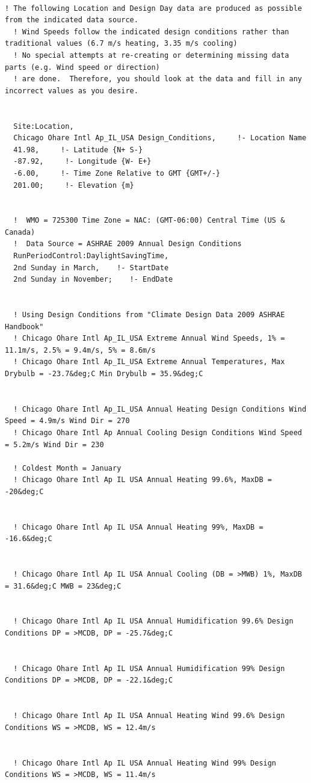 \begin{lstlisting}

! The following Location and Design Day data are produced as possible from the indicated data source.
  ! Wind Speeds follow the indicated design conditions rather than traditional values (6.7 m/s heating, 3.35 m/s cooling)
  ! No special attempts at re-creating or determining missing data parts (e.g. Wind speed or direction)
  ! are done.  Therefore, you should look at the data and fill in any incorrect values as you desire.


  Site:Location,
  Chicago Ohare Intl Ap_IL_USA Design_Conditions,     !- Location Name
  41.98,     !- Latitude {N+ S-}
  -87.92,     !- Longitude {W- E+}
  -6.00,     !- Time Zone Relative to GMT {GMT+/-}
  201.00;     !- Elevation {m}


  !  WMO = 725300 Time Zone = NAC: (GMT-06:00) Central Time (US & Canada)
  !  Data Source = ASHRAE 2009 Annual Design Conditions
  RunPeriodControl:DaylightSavingTime,
  2nd Sunday in March,    !- StartDate
  2nd Sunday in November;    !- EndDate


  ! Using Design Conditions from "Climate Design Data 2009 ASHRAE Handbook"
  ! Chicago Ohare Intl Ap_IL_USA Extreme Annual Wind Speeds, 1% = 11.1m/s, 2.5% = 9.4m/s, 5% = 8.6m/s
  ! Chicago Ohare Intl Ap_IL_USA Extreme Annual Temperatures, Max Drybulb = -23.7&deg;C Min Drybulb = 35.9&deg;C


  ! Chicago Ohare Intl Ap_IL_USA Annual Heating Design Conditions Wind Speed = 4.9m/s Wind Dir = 270
  ! Chicago Ohare Intl Ap Annual Cooling Design Conditions Wind Speed = 5.2m/s Wind Dir = 230

  ! Coldest Month = January
  ! Chicago Ohare Intl Ap IL USA Annual Heating 99.6%, MaxDB = -20&deg;C


  ! Chicago Ohare Intl Ap IL USA Annual Heating 99%, MaxDB = -16.6&deg;C


  ! Chicago Ohare Intl Ap IL USA Annual Cooling (DB = >MWB) 1%, MaxDB = 31.6&deg;C MWB = 23&deg;C


  ! Chicago Ohare Intl Ap IL USA Annual Humidification 99.6% Design Conditions DP = >MCDB, DP = -25.7&deg;C


  ! Chicago Ohare Intl Ap IL USA Annual Humidification 99% Design Conditions DP = >MCDB, DP = -22.1&deg;C


  ! Chicago Ohare Intl Ap IL USA Annual Heating Wind 99.6% Design Conditions WS = >MCDB, WS = 12.4m/s


  ! Chicago Ohare Intl Ap IL USA Annual Heating Wind 99% Design Conditions WS = >MCDB, WS = 11.4m/s





\end{lstlisting}
